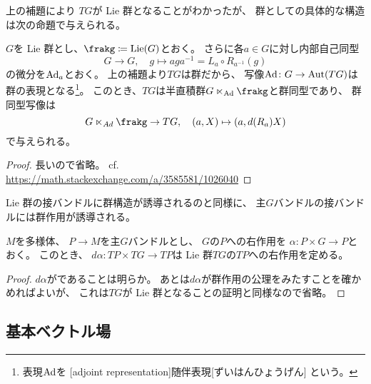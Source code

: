\documentclass[report]{jlreq}
\begin{document}
上の補題により
$TG$が Lie 群となることがわかったが、
群としての具体的な構造は次の命題で与えられる。

\begin{proposition}[$TG$の群構造]
    $G$を Lie 群とし、$\frakg \coloneqq \Lie(G)$とおく。
    さらに各$a \in G$に対し内部自己同型
    \begin{equation}
        G \to G,
        \quad
        g \mapsto a g a^{-1}
        = L_a \circ R_{a^{-1}} (g)
    \end{equation}
    の微分を$\operatorname{Ad}_a$とおく。
    上の補題より$TG$は群だから、
    写像$\operatorname{Ad} \colon G \to \operatorname{Aut}(TG)$は群の表現となる\footnote{
        表現$\operatorname{Ad}$を
        [adjoint representation]{随伴表現}[ずいはんひょうげん]
        という。
    }。
    このとき、$TG$は半直積群$G \ltimes_{\Ad} \frakg$と群同型であり、
    群同型写像は
    \begin{equation}
        G \ltimes_{Ad} \frakg \to TG,
        \quad
        (a, X) \mapsto (a, d(R_a) X)
    \end{equation}
    で与えられる。
\end{proposition}

\begin{proof}
    長いので省略。
    cf. \url{https://math.stackexchange.com/a/3585581/1026040}
\end{proof}

Lie 群の接バンドルに群構造が誘導されるのと同様に、
主$G$バンドルの接バンドルには群作用が誘導される。

\begin{lemma}
    $M$を多様体、
    $P \to M$を主$G$バンドルとし、
    $G$の$P$への{\smooth}右作用を
    $\alpha \colon P \times G \to P$とおく。
    このとき、
    $d\alpha \colon TP \times TG \to TP$は
    Lie 群$TG$の$TP$への{\smooth}右作用を定める。
\end{lemma}

\begin{proof}
    $d\alpha$が{\smooth}であることは明らか。
    あとは$d\alpha$が群作用の公理をみたすことを確かめればよいが、
    これは$TG$が Lie 群となることの証明と同様なので省略。
\end{proof}

\subsection{基本ベクトル場}
\end{document}
